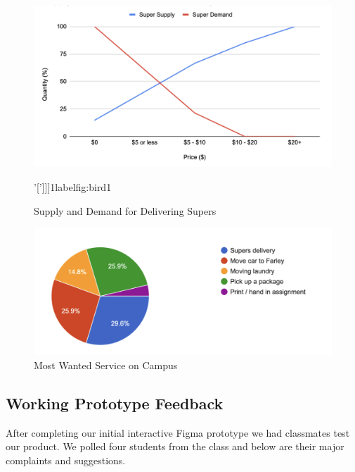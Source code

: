 \begin{figure}[ht]
        \centering
        \caption{Supply and Demand for Delivering Supers}
        \includegraphics[width=1\textwidth]{images/supers.png}
        
        \;'[']]]1label{fig:bird1}
    \end{figure}


\begin{figure}[ht]
        \centering
        \caption{Most Wanted Service on Campus}
        \includegraphics[width=1\textwidth]{images/pie.png}
        
        \label{fig:bird1}
    \end{figure}


\clearpage 
\subsection{Working Prototype Feedback}

After completing our initial interactive Figma prototype we had classmates test our product. We polled four students from the class and below are their major complaints and suggestions. \\

